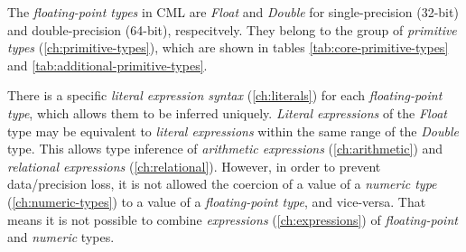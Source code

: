 The \emph{floating-point types} in CML are \emph{Float} and \emph{Double}
for single-precision (32-bit) and double-precision (64-bit), respecitvely.
They belong to the group of \emph{primitive types} (\ref{ch:primitive-types}),
which are shown in tables \ref{tab:core-primitive-types} and \ref{tab:additional-primitive-types}.

There is a specific \emph{literal expression syntax} (\ref{ch:literals})
for each \emph{floating-point type},
which allows them to be inferred uniquely.
\emph{Literal expressions} of the \emph{Float} type may be equivalent
to \emph{literal expressions} within the same range of the \emph{Double} type.
This allows type inference of \emph{arithmetic expressions} (\ref{ch:arithmetic})
and \emph{relational expressions} (\ref{ch:relational}).
However,
in order to prevent data/precision loss,
it is not allowed the coercion of a value of a \emph{numeric type}
(\ref{ch:numeric-types}) to a value of a \emph{floating-point type},
and vice-versa.
That means it is not possible to combine \emph{expressions} (\ref{ch:expressions})
of \emph{floating-point} and \emph{numeric} types.
